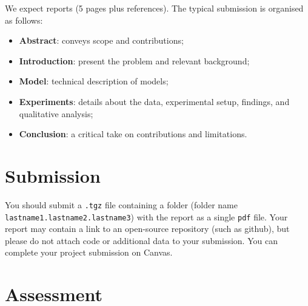 We expect reports (5 pages plus references). The typical submission is organised as follows: 
\begin{itemize}
	\item \textbf{Abstract}: conveys scope and contributions;
	\item \textbf{Introduction}: present the problem and relevant background;
	\item \textbf{Model}: technical description of models;
	\item \textbf{Experiments}: details about the data, experimental setup, findings, and qualitative analysis;
	\item \textbf{Conclusion}: a critical take on contributions and limitations.
\end{itemize}



\section{Submission}

You should submit a \texttt{.tgz} file containing a folder (folder name {\tt lastname1.lastname2.lastname3}) with the report as a single \texttt{pdf} file.
Your report may contain a link to an open-source repository (such as github), but please do not attach code or additional data to your submission. You can complete your project submission on Canvas.

\section{Assessment}

